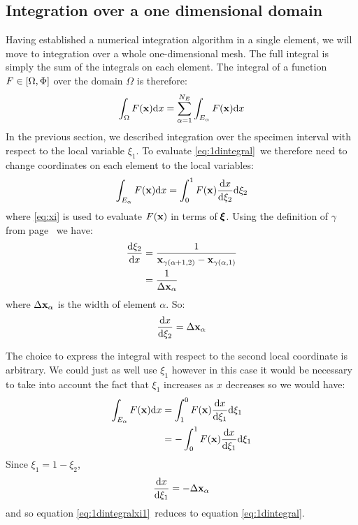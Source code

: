 \documentclass[a4paper, 11pt]{book}
\begin{document}
\subsection{Integration over a one dimensional domain}

Having established a numerical integration algorithm in a single element, we
will move to integration over a whole one-dimensional mesh. The full
integral is simply the sum of the integrals on each element. The integral of
a function $F\in[\Omega,\Phi]$ over the domain $\Omega$ is therefore:
\begin{equation}\label{eq:1dintegral}
  \int_\Omega F(\mathbf{x})\mathrm{d} x=\sum_{\alpha=1}^{N_E}\int_{E_\alpha} F(\mathbf{x})\mathrm{d} x
\end{equation}
In the previous section, we described integration over the specimen interval
with respect to the local variable $\xi_1$. To evaluate
\eqref{eq:1dintegral}\ we therefore need to change coordinates on each
element to the local variables:
\begin{equation}
  \int_{E_\alpha} F(\mathbf{x})\mathrm{d} x = \int_0^1 F(\mathbf{x})\frac{\mathrm{d} x}{\mathrm{d}\xi_2}\mathrm{d}\xi_2
\end{equation}
where \eqref{eq:xi} is used to evaluate $F(\mathbf{x})$ in terms of $\pmb{\xi}$. Using
the definition of $\gamma$ from page \pageref{gamma}\ we have:
\begin{equation}\label{eq:dxidx}
  \begin{split}
    \frac{\mathrm{d}\xi_2}{\mathrm{d} x} 
    &=\frac{1}{\mathbf{x}_{\gamma(\alpha+1,2)}-\mathbf{x}_{\gamma(\alpha,1)}}\\
    &=\frac{1}{\Delta\mathbf{x}_{\alpha}}
  \end{split}
\end{equation}
where $\Delta\mathbf{x}_{\alpha}$ is the width of element $\alpha$. So:
\begin{equation}\label{eq:dxdxi}
    \frac{\mathrm{d} x}{\mathrm{d}\xi_2}= \Delta\mathbf{x}_{\alpha}    
\end{equation}

The choice to express the integral with respect to the second local
coordinate is arbitrary. We could just as well use $\xi_1$ however in this
case it would be necessary to take into account the fact that $\xi_1$
increases as $x$ decreases so we would have:
\begin{equation}\label{eq:1dintegralxi1}
  \begin{split}
    \int_{E_\alpha} F(\mathbf{x})\mathrm{d} x &= \int_1^0 F(\mathbf{x})\frac{\mathrm{d} x}{\mathrm{d}\xi_1}\mathrm{d}\xi_1\\
    &=-\int_0^1 F(\mathbf{x})\frac{\mathrm{d} x}{\mathrm{d}\xi_1}\mathrm{d}\xi_1
  \end{split}
\end{equation}
Since $\xi_1=1-\xi_2$, 
\begin{equation}
  \frac{\mathrm{d} x}{\mathrm{d}\xi_1} =-\Delta\mathbf{x}_{\alpha}
\end{equation}
and so equation \eqref{eq:1dintegralxi1}\ reduces to equation \eqref{eq:1dintegral}.
\end{document}
